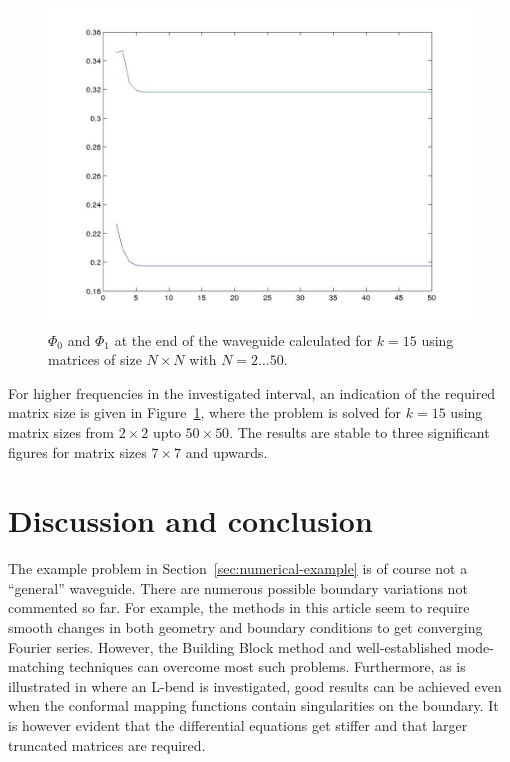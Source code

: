 \documentclass{svjour3}
\renewcommand{\Phi}{\varPhi}
\renewcommand{\Phi}{\varPhi}
\begin{document}
\begin{figure}[t]
  \centering
  \includegraphics[scale=0.45]{T_N}
  \caption{$\Phi_0$ and $\Phi_1$ at the end of the waveguide
    calculated for $k=15$ using matrices of size $N\times N$ with
    $N=2\dots50$.}
  \label{fig:T_N}
\end{figure}

For higher frequencies in the investigated interval, an indication of
the required matrix size is given in Figure~\ref{fig:T_N}, where the
problem is solved for $k=15$ using matrix sizes from $2\times2$ upto
$50\times50$. The results are stable to three significant figures for
matrix sizes $7\times7$ and upwards.


\section{Discussion and conclusion}
\label{sec:conclusion}

The example problem in Section~\ref{sec:numerical-example} is of
course not a ``general'' wave\-guide. There are numerous possible
boundary variations not commented so far. For example, the methods in
this article seem to require smooth changes in both geometry and
boundary conditions to get converging Fourier series. However, the
Building Block method and well-established mode-matching techniques
can overcome most such problems. Furthermore, as is illustrated in
\cite{Nilsson:2002} where an L-bend is investigated, good results can
be achieved even when the conformal mapping functions contain
singularities on the boundary. It is however evident that the
differential equations get stiffer and that larger truncated matrices
are required.
\end{document}
